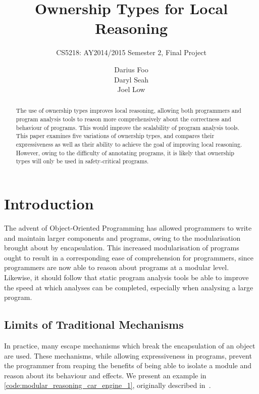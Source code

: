\documentclass{acm_proc_article-sp}
\begin{document}
\title{Ownership Types for Local Reasoning}
\subtitle{CS5218: AY2014/2015 Semester 2, Final Project}


\author{
\alignauthor
Darius Foo\\
\alignauthor
Daryl Seah\\
\alignauthor
Joel Low\\
}



\maketitle
\begin{abstract}
The use of ownership types improves local reasoning, allowing both programmers
and program analysis tools to reason more comprehensively about the correctness
and behaviour of programs. This would improve the scalability of program
analysis tools. This paper examines five variations of ownership types, and
compares their expressiveness as well as their ability to achieve the goal of
improving local reasoning. However, owing to the difficulty of annotating
programs, it is likely that ownership types will only be used in
safety-critical programs.
\end{abstract}

\section{Introduction}
\label{sec:introduction}

The advent of Object-Oriented Programming has allowed programmers to write and
maintain larger components and programs, owing to the modularisation brought
about by encapsulation. This increased modularisation of programs ought to
result in a corresponding ease of comprehension for programmers, since
programmers are now able to reason about programs at a modular level.
Likewise, it should follow that static program analysis tools be able to
improve the speed at which analyses can be completed, especially when analysing
a large program.

\subsection{Limits of Traditional Mechanisms}
\label{subsec:traditional_mechanism_limits}
In practice, many escape mechanisms which break the encapsulation of an object
are used. These mechanisms, while allowing expressiveness in programs, prevent
the programmer from reaping the benefits of being able to isolate a module and
reason about its behaviour and effects. We present an example in
\cref{code:modular_reasoning_car_engine_1}, originally
described in~\cite{clarke98ownership}.
\end{document}
